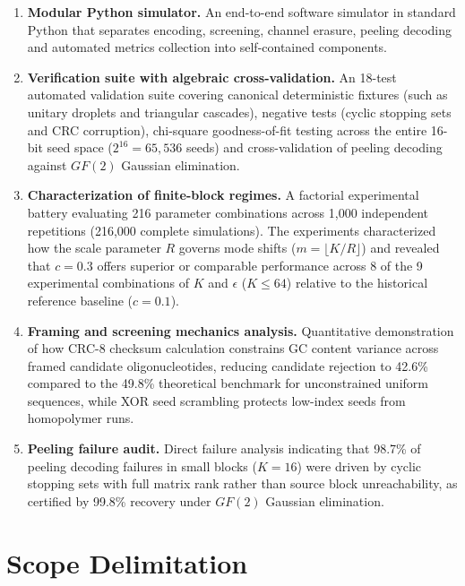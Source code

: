 \begin{enumerate}
    \item \textbf{Modular Python simulator.} An end-to-end software simulator in standard Python that separates encoding, screening, channel erasure, peeling decoding and automated metrics collection into self-contained components.
    
    \item \textbf{Verification suite with algebraic cross-validation.} An 18-test automated validation suite covering canonical deterministic fixtures (such as unitary droplets and triangular cascades), negative tests (cyclic stopping sets and CRC corruption), chi-square goodness-of-fit testing across the entire 16-bit seed space ($2^{16} = 65{,}536$ seeds) and cross-validation of peeling decoding against $GF(2)$ Gaussian elimination.
    
    \item \textbf{Characterization of finite-block regimes.} A factorial experimental battery evaluating 216 parameter combinations across 1,000 independent repetitions (216,000 complete simulations). The experiments characterized how the scale parameter $R$ governs mode shifts ($m = \lfloor K/R \rfloor$) and revealed that $c = 0.3$ offers superior or comparable performance across 8 of the 9 experimental combinations of $K$ and $\epsilon$ ($K \le 64$) relative to the historical reference baseline ($c = 0.1$).
    
    \item \textbf{Framing and screening mechanics analysis.} Quantitative demonstration of how CRC-8 checksum calculation constrains GC content variance across framed candidate oligonucleotides, reducing candidate rejection to 42.6\% compared to the 49.8\% theoretical benchmark for unconstrained uniform sequences, while XOR seed scrambling protects low-index seeds from homopolymer runs.
    
    \item \textbf{Peeling failure audit.} Direct failure analysis indicating that 98.7\% of peeling decoding failures in small blocks ($K = 16$) were driven by cyclic stopping sets with full matrix rank rather than source block unreachability, as certified by 99.8\% recovery under $GF(2)$ Gaussian elimination.
\end{enumerate}

\section{Scope Delimitation}
\label{sec:scope_delimitation}

